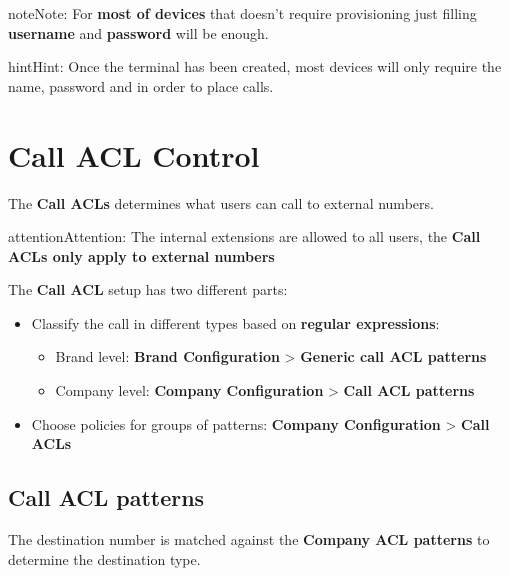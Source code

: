 \documentclass[letterpaper,10pt,english]{sphinxmanual}
\begin{document}
\begin{notice}{note}{Note:}
For \textbf{most of devices} that doesn't require provisioning just
filling \textbf{username} and \textbf{password} will be enough.
\end{notice}

\begin{notice}{hint}{Hint:}
Once the terminal has been created, most devices will only
require the name, password and {\hyperref[internal_calls/brand_portal:domain\string-per\string-company]{}}
in order to place calls.
\end{notice}


\section{Call ACL Control}
\label{pbx_features/call_permissions:call-permissions}\label{pbx_features/call_permissions::doc}\label{pbx_features/call_permissions:call-acl-control}
The \textbf{Call ACLs} determines what users can call to external numbers.

\begin{notice}{attention}{Attention:}
The internal extensions are allowed to all users, the \textbf{Call
ACLs only apply to external numbers}
\end{notice}

The \textbf{Call ACL} setup has two different parts:
\begin{itemize}
\item {} 
Classify the call in different types based on \textbf{regular expressions}:
\begin{itemize}
\item {} 
Brand level: \textbf{Brand Configuration} \textgreater{} \textbf{Generic call ACL patterns}

\item {} 
Company level: \textbf{Company Configuration} \textgreater{} \textbf{Call ACL patterns}

\end{itemize}

\item {} 
Choose policies for groups of patterns: \textbf{Company Configuration} \textgreater{} \textbf{Call
ACLs}

\end{itemize}


\subsection{Call ACL patterns}
\label{pbx_features/call_permissions:call-acl-patterns}
The destination number is matched against the \textbf{Company ACL patterns} to determine
the destination type.
\end{document}
